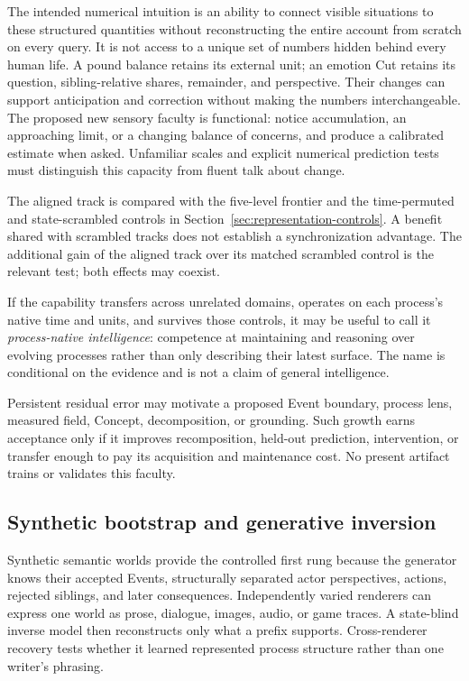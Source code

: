 \documentclass[10pt]{article}
\begin{document}
The intended numerical intuition is an ability to connect visible situations
to these structured quantities without reconstructing the entire account from
scratch on every query. It is not access to a unique set of numbers hidden
behind every human life. A pound balance retains its external unit; an emotion
Cut retains its question, sibling-relative shares, remainder, and perspective.
Their changes can support anticipation and correction without making the
numbers interchangeable. The proposed new sensory faculty is functional:
notice accumulation, an approaching limit, or a changing balance of concerns,
and produce a calibrated estimate when asked. Unfamiliar scales and explicit
numerical prediction tests must distinguish this capacity from fluent talk
about change.

The aligned track is compared with the five-level frontier and the
time-permuted and state-scrambled controls in Section~\ref{sec:representation-controls}.
A benefit shared with scrambled tracks does not establish a synchronization
advantage. The additional gain of the aligned track over its matched scrambled
control is the relevant test; both effects may coexist.

If the capability transfers across unrelated domains, operates on each
process's native time and units, and survives those controls, it may be useful
to call it \emph{process-native intelligence}: competence at maintaining and
reasoning over evolving processes rather than only describing their latest
surface. The name is conditional on the evidence and is not a claim of general
intelligence.

Persistent residual error may motivate a proposed Event boundary, process
lens, measured field, Concept, decomposition, or grounding. Such growth earns acceptance only if it
improves recomposition, held-out prediction, intervention, or transfer enough
to pay its acquisition and maintenance cost. No present artifact trains or
validates this faculty.

\subsection{Synthetic bootstrap and generative inversion}
\label{sec:generative-inversion}

Synthetic semantic worlds provide the controlled first rung because the
generator knows their accepted Events, structurally separated actor
perspectives, actions, rejected siblings,
and later consequences. Independently varied renderers can express one world
as prose, dialogue, images, audio, or game traces. A state-blind inverse model
then reconstructs only what a prefix supports. Cross-renderer recovery tests
whether it learned represented process structure rather than one writer's
phrasing.
\end{document}
